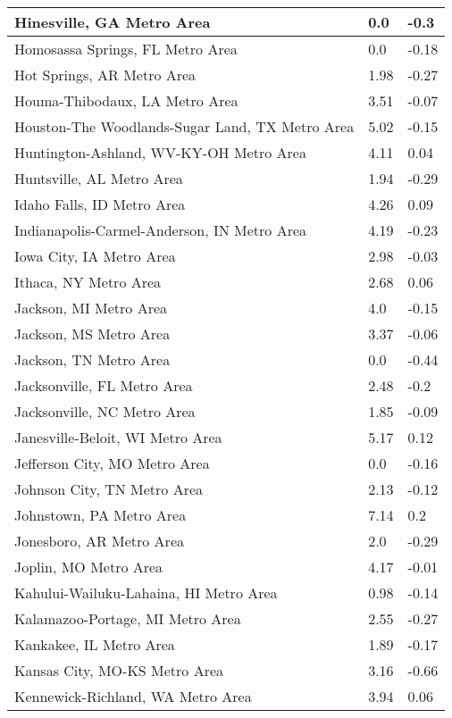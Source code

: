 \documentclass[12pt,oneside, letterpaper]{book}
\begin{document}
\begin{longtable}{| p{} | p{} | p{} |}
    Hinesville, GA Metro Area & 0.0 & -0.3 \\ \hline
    Homosassa Springs, FL Metro Area & 0.0 & -0.18 \\ \hline
    Hot Springs, AR Metro Area & 1.98 & -0.27 \\ \hline
    Houma-Thibodaux, LA Metro Area & 3.51 & -0.07 \\ \hline
    Houston-The Woodlands-Sugar Land, TX Metro Area & 5.02 & -0.15 \\ \hline
    Huntington-Ashland, WV-KY-OH Metro Area & 4.11 & 0.04 \\ \hline
    Huntsville, AL Metro Area & 1.94 & -0.29 \\ \hline
    Idaho Falls, ID Metro Area & 4.26 & 0.09 \\ \hline
    Indianapolis-Carmel-Anderson, IN Metro Area & 4.19 & -0.23 \\ \hline
    Iowa City, IA Metro Area & 2.98 & -0.03 \\ \hline
    Ithaca, NY Metro Area & 2.68 & 0.06 \\ \hline
    Jackson, MI Metro Area & 4.0 & -0.15 \\ \hline
    Jackson, MS Metro Area & 3.37 & -0.06 \\ \hline
    Jackson, TN Metro Area & 0.0 & -0.44 \\ \hline
    Jacksonville, FL Metro Area & 2.48 & -0.2 \\ \hline
    Jacksonville, NC Metro Area & 1.85 & -0.09 \\ \hline
    Janesville-Beloit, WI Metro Area & 5.17 & 0.12 \\ \hline
    Jefferson City, MO Metro Area & 0.0 & -0.16 \\ \hline
    Johnson City, TN Metro Area & 2.13 & -0.12 \\ \hline
    Johnstown, PA Metro Area & 7.14 & 0.2 \\ \hline
    Jonesboro, AR Metro Area & 2.0 & -0.29 \\ \hline
    Joplin, MO Metro Area & 4.17 & -0.01 \\ \hline
    Kahului-Wailuku-Lahaina, HI Metro Area & 0.98 & -0.14 \\ \hline
    Kalamazoo-Portage, MI Metro Area & 2.55 & -0.27 \\ \hline
    Kankakee, IL Metro Area & 1.89 & -0.17 \\ \hline
    Kansas City, MO-KS Metro Area & 3.16 & -0.66 \\ \hline
    Kennewick-Richland, WA Metro Area & 3.94 & 0.06 \\ \hline

\end{longtable}
\end{document}
